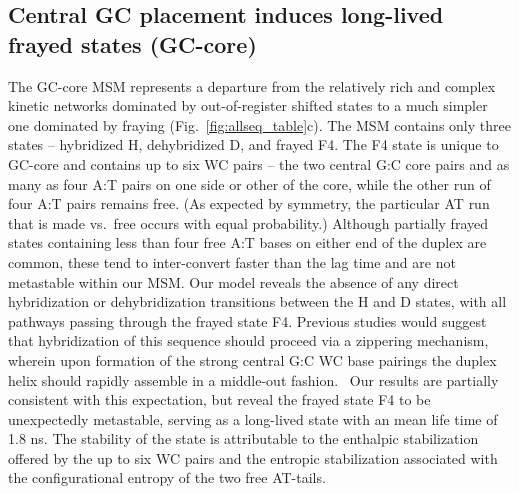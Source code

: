 \documentclass[journal=jpcbfk,manuscript=article]{achemso}
\begin{document}
\subsection{Central GC placement induces long-lived frayed states (GC-core)} \label{sec:GC-core}

The GC-core MSM represents a departure from the relatively rich and complex kinetic networks dominated by out-of-register shifted states to a much simpler one dominated by fraying (Fig.~\ref{fig:allseq_table}c). The MSM contains only three states -- hybridized H, dehybridized D, and frayed F4. The F4 state is unique to GC-core and contains up to six WC pairs -- the two central G:C core pairs and as many as four A:T pairs on one side or other of the core, while the other run of four A:T pairs remains free. (As expected by symmetry, the particular AT run that is made vs.\ free occurs with equal probability.) Although partially frayed states containing less than four free A:T bases on either end of the duplex are common, these tend to inter-convert faster than the lag time and are not metastable within our MSM. Our model reveals the absence of any direct hybridization or dehybridization transitions between the H and D states, with all pathways passing through the frayed state F4. Previous studies would suggest that hybridization of this sequence should proceed via a zippering mechanism, wherein upon formation of the strong central G:C WC base pairings the duplex helix should rapidly assemble in a middle-out fashion.~\citep{Romano2013DNADependence, Yin2011KineticsHybridization} Our results are partially consistent with this expectation, but reveal the frayed state F4 to be unexpectedly metastable, serving as a long-lived state with an mean life time of 1.8 ns. The stability of the state is attributable to the enthalpic stabilization offered by the up to six WC pairs and the entropic stabilization associated with the configurational entropy of the two free AT-tails.
\end{document}
